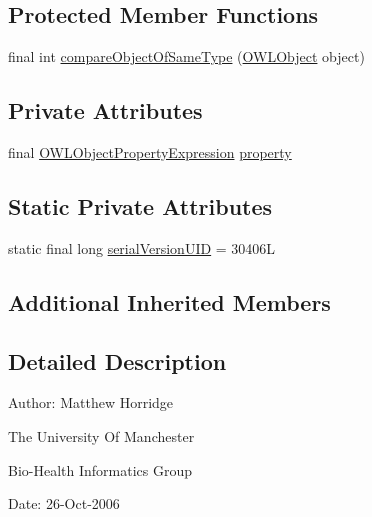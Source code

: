 \subsection*{Protected Member Functions}
\begin{DoxyCompactItemize}
\item 
final int \hyperlink{classuk_1_1ac_1_1manchester_1_1cs_1_1owl_1_1owlapi_1_1_o_w_l_object_property_characteristic_axiom_impl_a3c02466c12cd313a8cd08f43e9a50c2e}{compare\-Object\-Of\-Same\-Type} (\hyperlink{interfaceorg_1_1semanticweb_1_1owlapi_1_1model_1_1_o_w_l_object}{O\-W\-L\-Object} object)
\end{DoxyCompactItemize}
\subsection*{Private Attributes}
\begin{DoxyCompactItemize}
\item 
final \hyperlink{interfaceorg_1_1semanticweb_1_1owlapi_1_1model_1_1_o_w_l_object_property_expression}{O\-W\-L\-Object\-Property\-Expression} \hyperlink{classuk_1_1ac_1_1manchester_1_1cs_1_1owl_1_1owlapi_1_1_o_w_l_object_property_characteristic_axiom_impl_ac99438140edc10b050c93559f367cdbb}{property}
\end{DoxyCompactItemize}
\subsection*{Static Private Attributes}
\begin{DoxyCompactItemize}
\item 
static final long \hyperlink{classuk_1_1ac_1_1manchester_1_1cs_1_1owl_1_1owlapi_1_1_o_w_l_object_property_characteristic_axiom_impl_ae18e5d0026001b65e3d2c33a553df8f6}{serial\-Version\-U\-I\-D} = 30406\-L
\end{DoxyCompactItemize}
\subsection*{Additional Inherited Members}


\subsection{Detailed Description}
Author\-: Matthew Horridge\par
 The University Of Manchester\par
 Bio-\/\-Health Informatics Group\par
 Date\-: 26-\/\-Oct-\/2006\par
\par
 

